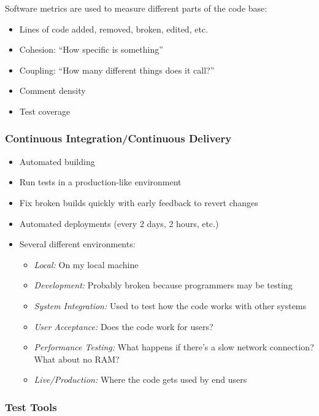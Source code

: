 Software metrics are used to measure different parts of the code base:

\begin{itemize}
	\item Lines of code added, removed, broken, edited, etc.
	\item Cohesion: ``How specific is something''
	\item Coupling: ``How many different things does it call?''
	\item Comment density
	\item Test coverage
\end{itemize}

\subsubsection{Continuous Integration/Continuous Delivery}\label{ssub:continuous_integration_continuous_delivery}

\begin{itemize}
	\item Automated building
	\item Run tests in a production-like environment
	\item Fix broken builds quickly with early feedback to revert changes
	\item Automated deployments (every 2 days, 2 hours, etc.)
	\item Several different environments:
	      \begin{itemize}
		      \item \emph{Local:} On my local machine
		      \item \emph{Development:} Probably broken because programmers may be testing
		      \item \emph{System Integration:} Used to test how the code works with other systems
		      \item \emph{User Acceptance:} Does the code work for users?
		      \item \emph{Performance Testing:} What happens if there's a slow network connection? What about no RAM?
		      \item \emph{Live/Production:} Where the code gets used by end users
	      \end{itemize}
\end{itemize}

\subsubsection{Test Tools}\label{ssub:test_tools}

